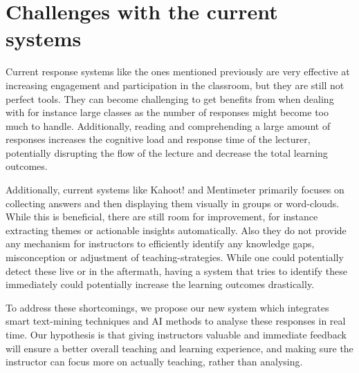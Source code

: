 \section{Challenges with the current systems}


Current response systems like the ones mentioned previously are very effective at increasing engagement and participation in the classroom, but they are still not perfect tools. They can become challenging to get benefits from when dealing with for instance large classes as the number of responses might become too much to handle. Additionally, reading and comprehending a large amount of responses increases the cognitive load and response time of the lecturer, potentially disrupting the flow of the lecture and decrease the total learning outcomes. 

Additionally, current systems like Kahoot! and Mentimeter primarily focuses on collecting answers and then displaying them visually in groups or word-clouds. While this is beneficial, there are still room for improvement, for instance extracting themes or actionable insights automatically. Also they do not provide any mechanism for instructors to efficiently identify any knowledge gaps, misconception or adjustment of teaching-strategies. While one could potentially detect these live or in the aftermath, having a system that tries to identify these immediately could potentially increase the learning outcomes drastically. 

To address these shortcomings, we propose our new system which integrates smart text-mining techniques and AI methods to analyse these responses in real time. Our hypothesis is that giving instructors valuable and immediate feedback will ensure a better overall teaching and learning experience, and making sure the instructor can focus more on actually teaching, rather than analysing.


